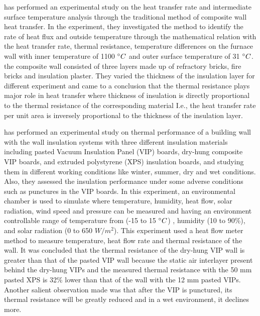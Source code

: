 \documentclass{article}
\begin{document}
\begin{multicols}{2}
\textcite{manoram2021experimental} has performed an experimental study on the heat transfer rate and intermediate surface temperature analysis through the traditional method of composite wall heat transfer. In the experiment, they investigated the method to identify the rate of heat flux and outside temperature through the mathematical relation with the heat transfer rate, thermal resistance, temperature differences on the furnace wall with inner temperature of 1100 $\degree C$ and outer surface temperature of 31 $\degree C$.  the composite wall consisted of three layers made up of refractory bricks, fire bricks and insulation plaster. They varied the thickness of the insulation layer for different experiment and came to a conclusion that the thermal resistance plays major role in heat transfer where thickness of insulation is directly proportional to the thermal resistance of the corresponding material I.e., the heat transfer rate per unit area is inversely proportional to the thickness of the insulation layer.
 
\textcite{li2020experimental} has performed an experimental study on thermal performance of a building wall with the wall insulation systems with three different insulation materials including pasted Vacuum Insulation Panel (VIP) boards, dry-hung composite VIP boards, and extruded polystyrene (XPS) insulation boards, and studying them in different working conditions like winter, summer, dry and wet conditions. Also, they assessed the insulation performance under some adverse conditions such as punctures in the VIP boards. In this experiment, an environmental chamber is used to simulate where temperature, humidity, heat flow, solar radiation, wind speed and pressure can be measured and having an environment controllable range of temperature from (-15 to 15  $\degree C$) , humidity (10 to 90\%), and solar radiation (0 to 650 $W/m^2$). This experiment used a heat flow meter method to measure temperature, heat flow rate and thermal resistance of the wall. It was concluded that the thermal resistance of the dry-hung VIP wall is greater than that of the pasted VIP wall because the static air interlayer present behind the dry-hung VIPs and the measured thermal resistance with the 50 mm pasted XPS is 32\% lower than that of the wall with the 12 mm pasted VIPs.  Another salient observation made was that after the VIP is punctured, its thermal resistance will be greatly reduced and in a wet environment, it declines more.
 

\end{multicols}
\end{document}
